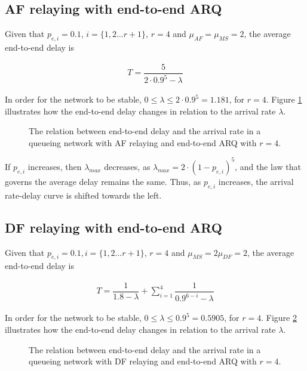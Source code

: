 \subsection{AF relaying with end-to-end ARQ}
Given that $p_{e,i} = 0.1$, $i = \{1,2 \dots r+1\}$, $r=4$ and
$\mu_{AF} = \mu_{MS} = 2$, the average end-to-end delay is

\begin{align}
  T = \dfrac{5}{2 \cdot 0.9^5 - \lambda}
  \label{eq:05_T_af_e2e}
\end{align}

In order for the network to be stable,
$0 \leq \lambda \leq 2 \cdot 0.9^5 = 1.181$, for $r=4$. Figure
\ref{fig:05_arrival_rate_af_e2e} illustrates how the end-to-end delay changes
in relation to the arrival rate $\lambda$.

\begin{figure}\centering
  
  \caption{The relation between end-to-end delay and the arrival rate in a
    queueing network with AF relaying and end-to-end ARQ with $r=4$.}
  \label{fig:05_arrival_rate_af_e2e}
\end{figure}

If $p_{e,i}$ increases, then $\lambda_{max}$ decreases, as
$\lambda_{max} = 2 \cdot (1-p_{e,i})^5$, and the law that governs the average
delay remains the same. Thus, as $p_{e,i}$ increases, the arrival rate-delay
curve is shifted towards the left.


\subsection{DF relaying with end-to-end ARQ}

Given that $p_{e,i} = 0.1, i = \{1,2 \dots r+1\}$, $r=4$ and
$\mu_{MS} = 2\mu_{DF} = 2$, the average end-to-end delay is

\begin{align}
  T = \dfrac{1}{1.8 - \lambda} + \sum\limits_{i=1}^4 \dfrac{1}{0.9^{6-i} - \lambda}
  \label{eq:05_T_df_e2e}
\end{align}


In order for the network to be stable,
$0 \leq \lambda \leq 0.9^5 = 0.5905$, for $r=4$. Figure
\ref{fig:05_arrival_rate_df_e2e} illustrates how the end-to-end delay changes in
relation to the arrival rate $\lambda$.


\begin{figure}\centering
  
  \caption{The relation between end-to-end delay and the arrival rate in a
    queueing network with DF relaying and end-to-end ARQ with $r=4$.}
  \label{fig:05_arrival_rate_df_e2e}
\end{figure}

